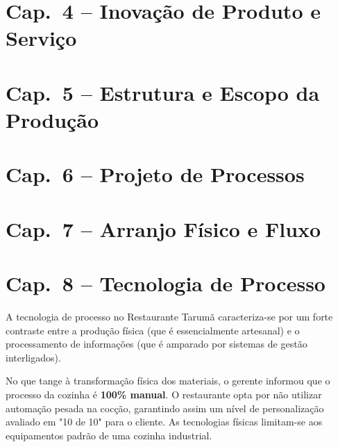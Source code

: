 \documentclass[12pt, a4paper]{article}
\begin{document}
\section{Cap.~4 – Inovação de Produto e Serviço}



\section{Cap.~5 – Estrutura e Escopo da Produção}



\section{Cap.~6 – Projeto de Processos}



\section{Cap.~7 – Arranjo Físico e Fluxo}



\section{Cap.~8 – Tecnologia de Processo}

A tecnologia de processo no Restaurante Tarumã caracteriza-se por um forte contraste entre a produção física (que é essencialmente artesanal) e o processamento de informações (que é amparado por sistemas de gestão interligados).

No que tange à transformação física dos materiais, o gerente informou que o processo da cozinha é \textbf{100\% manual}. O restaurante opta por não utilizar automação pesada na cocção, garantindo assim um nível de personalização avaliado em "10 de 10" para o cliente. As tecnologias físicas limitam-se aos equipamentos padrão de uma cozinha industrial.
\end{document}
